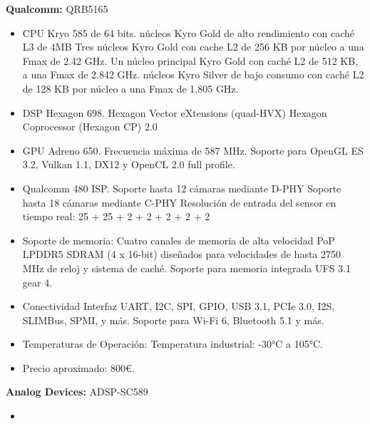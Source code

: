 \documentclass[11pt]{report}
\begin{document}
\textbf{Qualcomm:} QRB5165
\begin{itemize}
  \item CPU Kryo 585 de 64 bits.
         núcleos Kyro Gold de alto rendimiento con caché L3 de 4MB
        \subsubitem Tres núcleos Kyro Gold con cache L2 de 256 KB por núcleo a una Fmax de 2.42 GHz.
        \subsubitem Un núcleo principal Kyro Gold con caché L2 de 512 KB, a una Fmax de 2.842 GHz.
         núcleos Kyro Silver de bajo consumo con caché L2 de 128 KB por núcleo a una Fmax de 1.805 GHz.
  \item DSP Hexagon 698.
        \subitem Hexagon Vector eXtensions (quad-HVX) 
        \subitem Hexagon Coprocessor (Hexagon CP) 2.0

  \item GPU Adreno 650.
        \subitem Frecuencia máxima de 587 MHz.
        \subitem Soporte para OpenGL ES 3.2, Vulkan 1.1, DX12 y OpenCL 2.0 full profile.

  \item Qualcomm 480 ISP.
        \subitem Soporte hasta 12 cámaras mediante D-PHY
        \subitem Soporte hasta 18 cámaras mediante C-PHY
        \subitem Resolución de entrada del sensor en tiempo real: 25 + 25 + 2 + 2 + 2 + 2 + 2
  
  \item Soporte de memoria:
        \subitem Cuatro canales de memoria de alta velocidad PoP LPDDR5 SDRAM (4 x 16-bit) diseñados para velocidades de hasta 2750 MHz de reloj y sistema de caché.
        \subitem Soporte para memoria integrada UFS 3.1 gear 4.

  \item Conectividad
        \subitem Interfaz UART, I2C, SPI, GPIO, USB 3.1, PCIe 3.0, I2S, SLIMBus, SPMI, y más.
        \subitem Soporte para Wi-Fi 6, Bluetooth 5.1 y más.

  \item Temperaturas de Operación:
        \subitem Temperatura industrial: -30°C a 105°C.

  \item Precio aproximado: 800\euro.
\end{itemize}

\textbf{Analog Devices:} ADSP-SC589
\begin{itemize}
  \item 
\end{itemize}

\newpage
\end{document}
